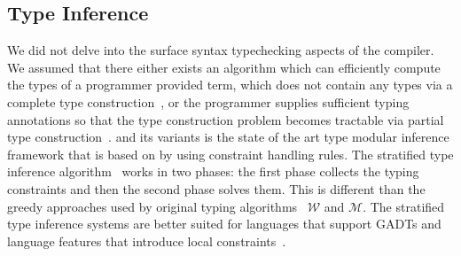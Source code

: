 \documentclass[screen,nonacm,manuscript,review]{acmart} %
\begin{document}
\subsection{Type Inference}\label{sec:rw-type-inf}
We did not delve into the surface syntax typechecking aspects of the
compiler. We assumed that there either exists an algorithm which can
efficiently compute the types of a programmer provided term, which
does not contain any types via a complete type
construction~\cite{milner_theory_1978}, or the  programmer supplies
sufficient typing annotations so that the type construction problem
becomes tractable via partial type
construction~\cite{pierce_local_2000, dunfield_bidirectional_2021}.
\HMX and its variants is the state of the art type modular inference
framework that is based on by using constraint handling rules. The
stratified type inference algorithm~\cite{pottier_stratified_2006} works in two
phases: the first phase collects the typing constraints and then the
second phase solves them. This is different than the greedy approaches
used by original typing algorithms~\cite{lee_proofs_1998} $\mathcal{W}$
and $\mathcal{M}$. The stratified type inference systems are better
suited for languages that support GADTs and language features that
introduce local constraints~\cite{vytiniotis_outsideinx_2011}.
\end{document}

